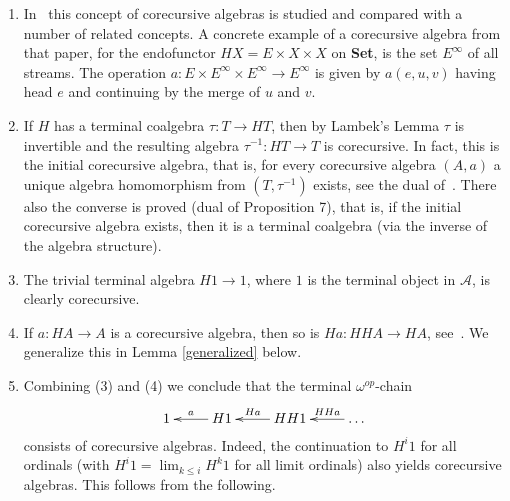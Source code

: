 \documentclass{LMCS}
\newcommand{\takeout}[1]{\empty}
\theoremstyle{plain}
\theoremstyle{definition}
\numberwithin{equation}{section}
\begin{document}
\begin{exa}\label{exam of core}\hfill
  \begin{enumerate}
  \item  In~\cite{cuv2} this concept of corecursive algebras is studied and compared with a number of related concepts. A concrete example of a corecursive algebra from that paper, for the endofunctor $HX=E\times X\times X$ on {\bf Set}, is the set $E^\infty$ of all streams. The operation $a:E\times E^\infty\times E^\infty\rightarrow E^\infty$ is given by $a(e,u,v)$ having head $e$ and continuing by the merge of $u$ and $v$.

\takeout{
(2) In a category with finite products consider algebras on one binary operation, i.e., $HX=X\times X$. An algebra $a:A\to A\times A$ is corecursive iff it has a unique idempotent (global) element. That is, a unique $i:1\to A$ with $a\cdot (i\times i)=a$.

Indeed, this is necessary since $i$ is the solution of $e=id :1\to
1\times 1$. And it is sufficient: given an equation morphism $e:X\to
X\times X$, the morphism $X\stackrel{!}\to 1\stackrel{i}\to A$ is
easily seen to be the unique solution of $e$ in $A$.
}

\item If $H$ has a terminal coalgebra $\tau:T\rightarrow HT$, then by Lambek's Lemma $\tau$ is invertible and the resulting algebra $\tau^{-1}:HT\rightarrow T$ is corecursive. In fact, this is the initial corecursive algebra, that is, for every corecursive algebra $(A,a)$  a unique algebra homomorphism  from $(T,\tau^{-1})$ exists, see the dual of~\cite[Proposition~2]{cuv2}. There also the converse is proved (dual of Proposition 7), that is, if the initial corecursive algebra exists, then it is a terminal coalgebra (via the inverse of the algebra structure).

\item The trivial terminal algebra $H1\rightarrow 1$, where $1$ is the terminal object in $\mathcal A$, is clearly corecursive.

\item If $a:HA\rightarrow A$ is a corecursive algebra, then so is $Ha:HHA\rightarrow HA$, see~\cite[Proposition~6]{cuv2}. We generalize this in Lemma \ref{generalized} below.

\item Combining (3) and (4) we conclude that the terminal $\omega^{op}$-chain
$$
\xymatrix{
1&H1\ar[l]_-a&HH1\ar[l]_-{Ha}&\ldots\ar[l]_-{HHa}
}
$$
consists of corecursive algebras. Indeed, the continuation to $H^i1$
for all ordinals (with $H^i1=\lim_{k\leq i} H^k1$ for all limit
ordinals) also yields corecursive algebras. This follows from the
following.
\end{enumerate}
\end{exa}
\end{document}
